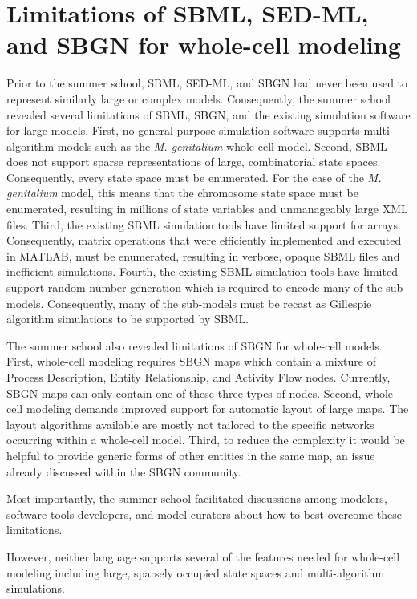 \documentclass[journal,transmag]{IEEEtran}
\begin{document}
\section{Limitations of SBML, SED-ML, and SBGN for whole-cell modeling}
Prior to the summer school, SBML, SED-ML, and SBGN had never been used to represent similarly large or complex models. 
Consequently, the summer school revealed several limitations of SBML, SBGN, and the existing simulation software for large models.
First, no general-purpose simulation software supports multi-algorithm models such as the \textit{M. genitalium} whole-cell model. 
Second, SBML does not support sparse representations of large, combinatorial state spaces. Consequently, every state space must be enumerated. For the case of the \textit{M. genitalium} model, this means that the chromosome state space must be enumerated, resulting in millions of state variables and unmanageably large XML files.
Third, the existing SBML simulation tools have limited support for arrays. Consequently, matrix operations that were efficiently implemented and executed in MATLAB, must be enumerated, resulting in verbose, opaque SBML files and inefficient simulations.
Fourth, the existing SBML simulation tools have limited support random number generation which is required to encode many of the sub-models. Consequently, many of the sub-models must be recast as Gillespie algorithm simulations to be supported by SBML.

The summer school also revealed  limitations of SBGN for whole-cell models. 
First, whole-cell modeling requires SBGN maps which contain a mixture of Process Description, Entity Relationship, and Activity Flow nodes. Currently, SBGN maps can only contain one of these three types of nodes.
Second, whole-cell modeling demands improved support for automatic layout of large maps. The layout algorithms available are mostly not tailored to the specific networks occurring within a whole-cell model. 
Third, to reduce the complexity it would be helpful to provide generic forms of other entities in the same map, an issue already discussed within the SBGN community.

Most importantly, the summer school facilitated discussions among modelers, software tools developers, and model curators about how to best overcome these limitations.

However, neither language supports several of the features needed for whole-cell modeling including large, sparsely occupied state spaces and multi-algorithm simulations. 
\end{document}
